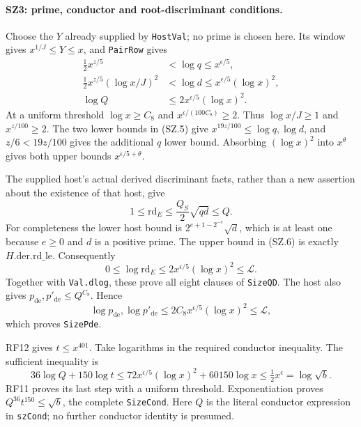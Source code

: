 \documentclass[11pt,a4paper]{article}
\numberwithin{equation}{section}
\theoremstyle{remark}\newtheorem{remark}[theorem]{Remark}
\begin{document}
\paragraph{SZ3: prime, conductor and root-discriminant conditions.}
Choose the $Y$ already supplied by \texttt{HostVal}; no prime is
chosen here. Its window gives $x^{1/J}\leq Y\leq x$, and
\texttt{PairRow} gives
\[
 \begin{split}
 \tfrac12 x^{z/5}&<\log q\leq x^{\epsilon/5},\\
 \tfrac12 x^{z/5}(\log x/J)^2
             &<\log d\leq x^{\epsilon/5}(\log x)^2,\\
 \log Q&\leq2x^{\epsilon/5}(\log x)^2.
 \end{split}                                                    \tag{SZ.5}
\]
At a uniform threshold $\log x\geq C_8$ and
$x^{\epsilon/(100C_8)}\geq2$. Thus $\log x/J\geq1$ and
$x^{z/100}\geq2$. The two lower bounds in (SZ.5) give
$x^{19z/100}\leq\log q,\log d$, and
$z/6<19z/100$ gives the additional $q$ lower bound.
Absorbing $(\log x)^2$ into $x^\theta$ gives both upper bounds
$x^{\epsilon/5+\theta}$.

The supplied host's actual derived discriminant facts, rather than a
new assertion about the existence of that host, give
\[
 1\leq\mathrm{rd}_E\leq\frac{Q_S}{2}\sqrt{qd}\leq Q.
                                                                    \tag{SZ.6}
\]
For completeness the lower host bound is
$2^{e+1-2^{-e}}\sqrt d$, which is at least one because $e\geq0$
and $d$ is a positive prime. The upper bound in (SZ.6) is exactly
$H.\mathrm{der.rd\_le}$. Consequently
\[
 0\leq\log\mathrm{rd}_E\leq2x^{\epsilon/5}(\log x)^2
                                     \leq\mathcal L.           \tag{SZ.7}
\]
Together with \texttt{Val.dlog}, these prove all eight clauses of
\texttt{SizeQD}. The host also gives
$p_{\mathrm{de}},p'_{\mathrm{de}}\leq Q^{C_8}$. Hence
\[
 \log p_{\mathrm{de}},\log p'_{\mathrm{de}}
      \leq2C_8x^{\epsilon/5}(\log x)^2\leq\mathcal L,
\]
which proves \texttt{SizePde}.

RF12 gives $t\leq x^{401}$. Take logarithms in the required
conductor inequality. The sufficient inequality is
\[
 36\log Q+150\log t
    \leq72x^{\epsilon/5}(\log x)^2+60150\log x
    \leq\tfrac12 x^\epsilon=\log\sqrt b.                       \tag{SZ.8}
\]
RF11 proves its last step with a uniform threshold. Exponentiation
proves $Q^{36}t^{150}\leq\sqrt b$, the complete
\texttt{SizeCond}. Here $Q$ is the literal conductor expression
in \texttt{szCond}; no further conductor identity is presumed.
\end{document}
